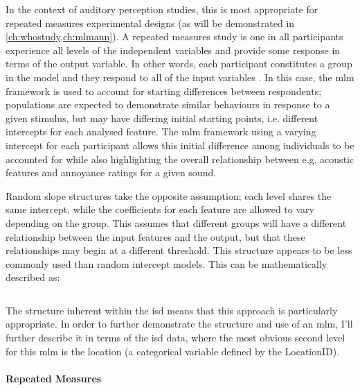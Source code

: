 In the context of auditory perception studies, this is most appropriate for repeated measures experimental designs (as will be demonstrated in \cref{ch:whostudy,ch:mlmann}). A repeated measures study is one in all participants experience all levels of the independent variables and provide some response in terms of the output variable. In other words, each participant constitutes a group in the model and they respond to all of the input variables \citep{Kristjansson2007Multilevel}. In this case, the \gls{mlm} framework is used to account for starting differences between respondents; populations are expected to demonstrate similar behaviours in response to a given stimulus, but may have differing initial starting points, i.e. different intercepts for each analysed feature. The \gls{mlm} framework using a varying intercept for each participant allows this initial difference among individuals to be accounted for while also highlighting the overall relationship between e.g. acoustic features and annoyance ratings for a given sound. 

Random slope structures take the opposite assumption; each level shares the same intercept, while the coefficients for each feature are allowed to vary depending on the group. This assumes that different groups will have a different relationship between the input features and the output, but that these relationships may begin at a different threshold. This structure appears to be less commonly used than random intercept models. This can be mathematically described as:

\begin{equation}
\end{equation}



The structure inherent within the \gls{isd} means that this approach is particularly appropriate. In order to further demonstrate the structure and use of an \gls{mlm}, I'll further describe it in terms of the \gls{isd} data, where the most obvious second level for this \gls{mlm} is the location (a categorical variable defined by the LocationID). 


\paragraph*{Repeated Measures}


